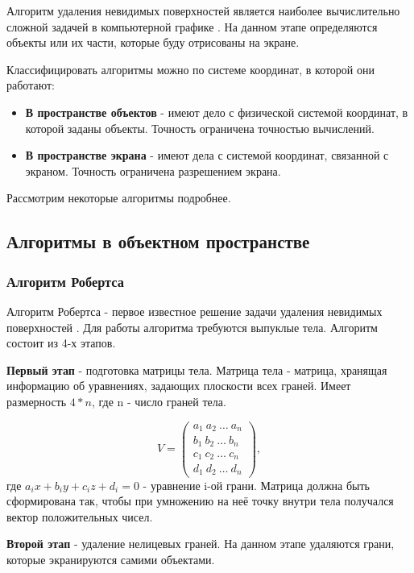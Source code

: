 Алгоритм удаления невидимых поверхностей является наиболее вычислительно сложной задачей в компьютерной графике \cite{rodgers}. На данном этапе определяются объекты или их части, которые буду отрисованы на экране.

Классифицировать алгоритмы можно по системе координат, в которой они работают:
\begin{itemize}
	\item\textbf{В пространстве объектов} - имеют дело с физической системой координат, в которой заданы объекты. Точность ограничена точностью вычислений.
	\item\textbf{В пространстве экрана} - имеют дела с системой координат, связанной с экраном. Точность ограничена разрешением экрана.
\end{itemize}
Рассмотрим некоторые алгоритмы подробнее.

\subsection{Алгоритмы в объектном пространстве}
\subsubsection{Алгоритм Робертса}
Алгоритм Робертса - первое известное решение задачи удаления невидимых поверхностей \cite{rodgers}. Для работы алгоритма требуются выпуклые тела. Алгоритм состоит из 4-х этапов.

\textbf{Первый этап} - подготовка матрицы тела. Матрица тела - матрица, хранящая информацию об уравнениях, задающих плоскости всех граней. Имеет размерность $4*n$, где n - число граней тела.

\begin{equation}
	\label{eq:body_matrix}
	V = \begin{pmatrix}
		a_1\ a_2\ \dots\ a_n \\
		b_1\ b_2\ \dots\ b_n \\
		c_1\ c_2\ \dots\ c_n \\
		d_1\ d_2\ \dots\ d_n 
	\end{pmatrix},
\end{equation}
где $ a_ix + b_iy + c_iz + d_i = 0 $ - уравнение i-ой грани. Матрица должна быть сформирована так, чтобы при умножению на неё точку внутри тела получался вектор положительных чисел.

\textbf{Второй этап} - удаление нелицевых граней. На данном этапе удаляются грани, которые экранируются самими объектами.

